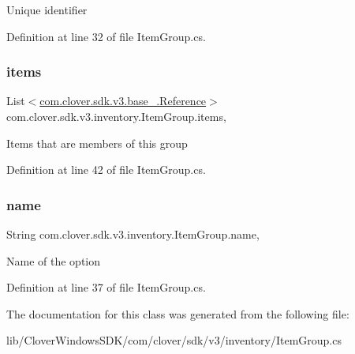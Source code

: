 Unique identifier 



Definition at line 32 of file Item\+Group.\+cs.

\mbox{\label{classcom_1_1clover_1_1sdk_1_1v3_1_1inventory_1_1_item_group_a35fe9229a8a5f6298790ac81c7c8ce76}} 
\subsubsection{\texorpdfstring{items}{items}}
{\footnotesize\ttfamily List$<$\hyperlink{classcom_1_1clover_1_1sdk_1_1v3_1_1base___1_1_reference}{com.\+clover.\+sdk.\+v3.\+base\+\_\+.\+Reference}$>$ com.\+clover.\+sdk.\+v3.\+inventory.\+Item\+Group.\+items\hspace{0.3cm}{\ttfamily [get]}, {\ttfamily [set]}}



Items that are members of this group 



Definition at line 42 of file Item\+Group.\+cs.

\mbox{\label{classcom_1_1clover_1_1sdk_1_1v3_1_1inventory_1_1_item_group_a9495378b9548b9b145ccd7b1c527f464}} 
\subsubsection{\texorpdfstring{name}{name}}
{\footnotesize\ttfamily String com.\+clover.\+sdk.\+v3.\+inventory.\+Item\+Group.\+name\hspace{0.3cm}{\ttfamily [get]}, {\ttfamily [set]}}



Name of the option 



Definition at line 37 of file Item\+Group.\+cs.



The documentation for this class was generated from the following file\+:\begin{DoxyCompactItemize}
\item 
lib/\+Clover\+Windows\+S\+D\+K/com/clover/sdk/v3/inventory/Item\+Group.\+cs\end{DoxyCompactItemize}
